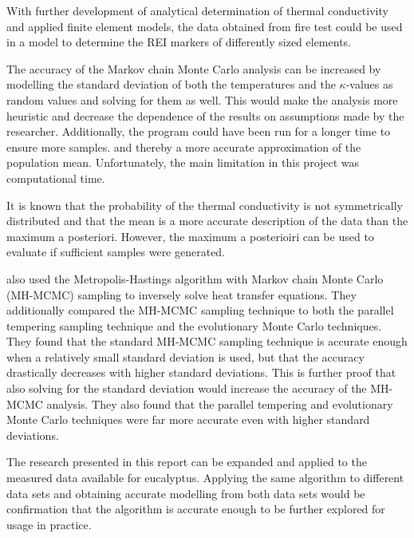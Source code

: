With further development of analytical determination of thermal conductivity and applied finite element models, the data obtained from fire test could be used in a model to determine the REI markers of differently sized elements.

The accuracy of the Markov chain Monte Carlo analysis can be increased by modelling the standard deviation of both the temperatures and the $\kappa$-values as random values and solving for them as well. 
This would make the analysis more heuristic and decrease the dependence of the results on assumptions made by the researcher. 
Additionally, the program could have been run for a longer time to ensure more samples. and thereby a more accurate approximation of the population mean. 
Unfortunately, the main limitation in this project was computational time.

It is known that the probability of the thermal conductivity is not symmetrically distributed and that the mean is a more accurate description of the data than the maximum a posteriori.
However, the maximum a posterioiri can be used to evaluate if sufficient samples were generated.




\cite{somasund:2016} also used the Metropolis-Hastings algorithm with Markov chain Monte Carlo (MH-MCMC) sampling to inversely solve heat transfer equations.
They additionally compared the MH-MCMC sampling technique to both the parallel tempering sampling technique and the evolutionary Monte Carlo techniques.
They found that the standard MH-MCMC sampling technique is accurate enough when a relatively small standard deviation is used, but that the accuracy drastically decreases with higher standard deviations.
This is further proof that also solving for the standard deviation would increase the accuracy of the MH-MCMC analysis.
They also found that the parallel tempering and evolutionary Monte Carlo techniques were far more accurate even with higher standard deviations.

The research presented in this report can be expanded and applied to the measured data available for eucalyptus. 
Applying the same algorithm to different data sets and obtaining accurate modelling from both data sets would be confirmation that the algorithm is accurate enough to be further explored for usage in practice.



